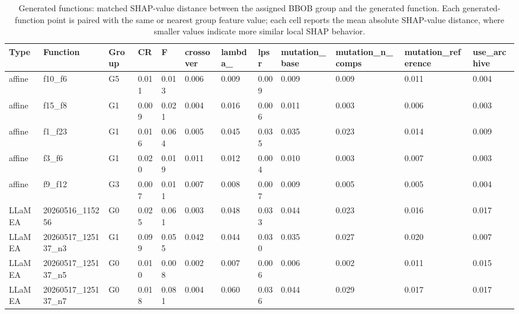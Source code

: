 \begin{table}[htbp]
\centering
\scriptsize
\setlength{\tabcolsep}{1.5pt}
\renewcommand{\arraystretch}{0.88}
\caption{Generated functions: matched SHAP-value distance between the assigned BBOB group and the generated function. Each generated-function point is paired with the same or nearest group feature value; each cell reports the mean absolute SHAP-value distance, where smaller values indicate more similar local SHAP behavior.}
\label{tab:generated-shap-value-wide-0307}
\begin{adjustbox}{width=\textwidth,center}
\begin{tabular}{llllllllllll}
\toprule
Type & Function & Group & CR & F & crossover & lambda\_ & lpsr & mutation\_base & mutation\_n\_comps & mutation\_reference & use\_archive \\
\midrule
affine & f10\_f6 & G5 & 0.011 & 0.013 & 0.006 & 0.009 & 0.009 & 0.009 & 0.009 & 0.011 & 0.004 \\
affine & f15\_f8 & G1 & 0.009 & 0.021 & 0.004 & 0.016 & 0.006 & 0.011 & 0.003 & 0.006 & 0.003 \\
affine & f1\_f23 & G1 & 0.016 & 0.064 & 0.005 & 0.045 & 0.035 & 0.035 & 0.023 & 0.014 & 0.009 \\
affine & f3\_f6 & G1 & 0.020 & 0.019 & 0.011 & 0.012 & 0.004 & 0.010 & 0.003 & 0.007 & 0.003 \\
affine & f9\_f12 & G3 & 0.007 & 0.011 & 0.007 & 0.008 & 0.007 & 0.009 & 0.005 & 0.005 & 0.004 \\
LLaMEA & 20260516\_115256 & G0 & 0.025 & 0.061 & 0.003 & 0.048 & 0.033 & 0.044 & 0.023 & 0.016 & 0.017 \\
LLaMEA & 20260517\_125137\_n3 & G1 & 0.099 & 0.055 & 0.042 & 0.044 & 0.030 & 0.035 & 0.027 & 0.020 & 0.007 \\
LLaMEA & 20260517\_125137\_n5 & G0 & 0.010 & 0.008 & 0.002 & 0.007 & 0.006 & 0.006 & 0.002 & 0.011 & 0.015 \\
LLaMEA & 20260517\_125137\_n7 & G0 & 0.018 & 0.081 & 0.004 & 0.060 & 0.036 & 0.044 & 0.029 & 0.017 & 0.017 \\
\bottomrule
\end{tabular}
\end{adjustbox}
\end{table}